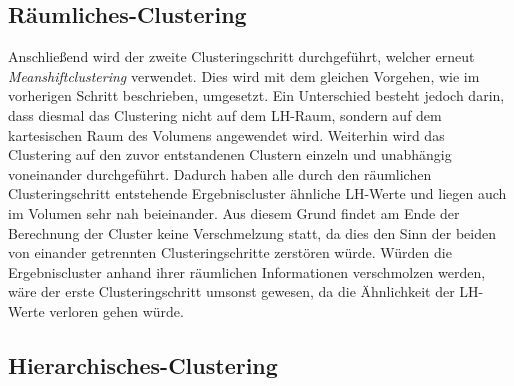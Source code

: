 \subsection{Räumliches-Clustering}

Anschließend wird der zweite Clusteringschritt durchgeführt, welcher erneut \textit{Meanshiftclustering} verwendet. Dies wird mit dem gleichen Vorgehen, wie im vorherigen Schritt beschrieben, umgesetzt. Ein Unterschied besteht jedoch darin, dass diesmal das Clustering nicht auf dem LH-Raum, sondern auf dem kartesischen Raum des Volumens angewendet wird. Weiterhin wird das Clustering auf den zuvor entstandenen Clustern einzeln und unabhängig voneinander durchgeführt. Dadurch haben alle durch den räumlichen Clusteringschritt entstehende Ergebniscluster ähnliche LH-Werte und liegen auch im Volumen sehr nah beieinander.
\newline
Aus diesem Grund findet am Ende der Berechnung der Cluster keine Verschmelzung statt, da dies den Sinn der beiden von einander getrennten Clusteringschritte zerstören würde. Würden die Ergebniscluster anhand ihrer räumlichen Informationen verschmolzen werden, wäre der erste Clusteringschritt umsonst gewesen, da die Ähnlichkeit der LH-Werte verloren gehen würde.



\subsection{Hierarchisches-Clustering}
 
